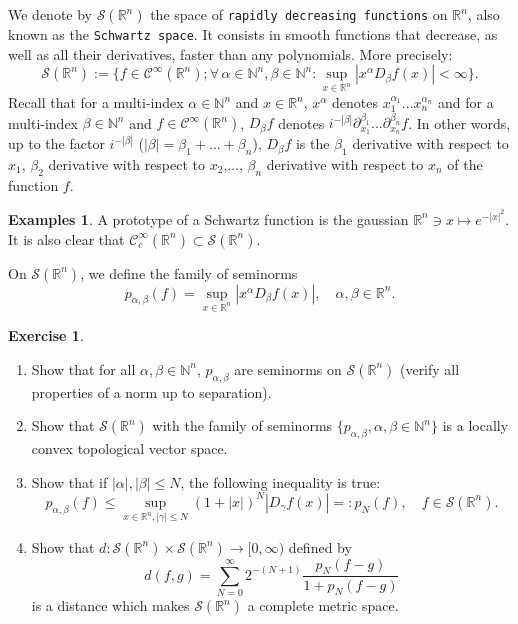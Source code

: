 \documentclass[a4paper, 12pt]{article}
\theoremstyle{plain}
\theoremstyle{definition}
\newtheorem{example}[proposition]{Examples}
\newtheorem{exercise}{Exercise}
\theoremstyle{remark}
\numberwithin{equation}{section}
\begin{document}
We denote by ${\mathscr{S}}({\mathds{R}}^n)$ the space of {\tt rapidly decreasing functions} on ${\mathds{R}}^n$,
also known as the {\tt Schwartz space}. It consists in smooth functions that decrease, as well as all their derivatives, faster than any polynomials.
More precisely:
\[
{\mathscr{S}}({\mathds{R}}^n):=\bigl\{f\in{\mathscr{C}}^\infty({\mathds{R}}^n); \forall\,\alpha\in{\mathds{N}}^n,\beta\in{\mathds{N}}^n:
\sup_{x\in{\mathds{R}}^n}|x^\alpha D_\beta f(x)|<\infty\bigr\}.
\]
Recall that for a multi-index $\alpha\in{\mathds{N}}^n$ and $x\in{\mathds{R}}^n$, $x^\alpha$ denotes $x_1^{\alpha_1}...x_n^{\alpha_n}$
and for a multi-index $\beta\in{\mathds{N}}^n$ and $f\in {\mathscr{C}}^\infty({\mathds{R}}^n)$, $D_\beta f$ denotes
$i^{-|\beta|}\partial_{x_1}^{\beta_1}...\partial_{x_n}^{\beta_n}f$. In other words, up to the factor $i^{-|\beta|}$ ($|\beta|=\beta_1+...+\beta_n$),
$D_\beta f$ is the $\beta_1$ derivative with respect to $x_1$, $\beta_2$ derivative with respect to $x_2$,..., $\beta_n$ derivative
with respect to $x_n$ of the function $f$.

\begin{example}
A prototype of a Schwartz function is the gaussian ${\mathds{R}}^n\ni x\mapsto e^{-|x|^2}$. It is also clear that 
${\mathscr{C}}^\infty_c({\mathds{R}}^n) \subset {\mathscr{S}}({\mathds{R}}^n)$.
\end{example}

On ${\mathscr{S}}({\mathds{R}}^n)$, we define the family of seminorms
\[
p_{\alpha,\beta}(f)=\sup_{x\in{\mathds{R}}^n}|x^\alpha D_\beta f(x)|, \quad \alpha,\beta\in{\mathds{R}}^n.
\]

\begin{exercise}
\begin{enumerate}
\item
Show that for all $\alpha,\beta\in{\mathds{N}}^n$, $p_{\alpha,\beta}$ are seminorms on ${\mathscr{S}}({\mathds{R}}^n)$
(verify all properties of a norm up to separation).
\item
Show that ${\mathscr{S}}({\mathds{R}}^n)$ with the family of seminorms $\{p_{\alpha,\beta}, \alpha,\beta\in{\mathds{N}}^n\}$
is a locally convex topological vector space.
\item
Show that if $|\alpha|,|\beta|\le N$, the following inequality is true:
\[
p_{\alpha,\beta}(f)\le \sup_{x\in{\mathds{R}}^n, |\gamma|\le N}(1+|x|)^N |D_\gamma f(x)| =: p_N(f), \quad f\in{\mathscr{S}}({\mathds{R}}^n).
\]
\item
Show that $d:{\mathscr{S}}({\mathds{R}}^n)\times {\mathscr{S}}({\mathds{R}}^n)\to [0,\infty)$ defined by
\[
d(f,g)=\sum_{N=0}^\infty 2^{-(N+1)}\frac{p_N(f-g)}{1+p_N(f-g)}
\]
is a distance which makes ${\mathscr{S}}({\mathds{R}}^n)$ a complete metric space.
\end{enumerate}
\end{exercise}
\end{document}
